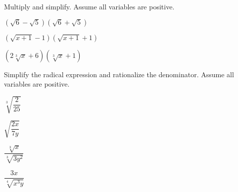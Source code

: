 \begin{exercise}
	Multiply and simplify. Assume all variables are positive. \\
	\begin{enumerate*}[label={(\arabic*)~}]
		\item $(\sqrt6-\sqrt5)(\sqrt6+\sqrt5)$
		\item $(\sqrt{x+1}-1)(\sqrt{x+1}+1)$
		\item $(2\sqrt[3]x+6)(\sqrt[3]x+1)$
		\hfill\null
	\end{enumerate*}
\end{exercise}



\vfill
\begin{center} \hfill
\end{center}


\begin{exercise}
	Simplify the radical expression and rationalize the denominator. Assume all variables are positive.\\
	\begin{enumerate*}[label={(\arabic*)~}, itemsep=1em]
		\item $\sqrt[3]{\dfrac2{25}}$
		\item $\sqrt{\dfrac{2x}{7y}}$
		\item $\dfrac{\sqrt[3]{x}}{\sqrt[3]{3y^2}}$
		\item $\dfrac{3x}{\sqrt[4]{x^3y}}$
		\hfill\null
	\end{enumerate*}
\end{exercise}

\vfill
\begin{center} \hfill
\end{center}



